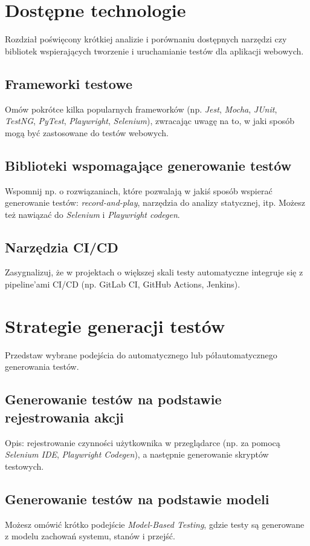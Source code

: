 \documentclass[12pt]{report}
\begin{document}
\chapter{Dostępne technologie}
{Rozdział poświęcony krótkiej analizie i porównaniu dostępnych narzędzi czy bibliotek wspierających tworzenie i uruchamianie testów dla aplikacji webowych.}

\section{Frameworki testowe}
{Omów pokrótce kilka popularnych frameworków (np. \emph{Jest}, \emph{Mocha}, \emph{JUnit}, \emph{TestNG}, \emph{PyTest}, \emph{Playwright}, \emph{Selenium}), zwracając uwagę na to, w jaki sposób mogą być zastosowane do testów webowych.}

\section{Biblioteki wspomagające generowanie testów}
{Wspomnij np. o rozwiązaniach, które pozwalają w jakiś sposób wspierać generowanie testów: \emph{record-and-play}, narzędzia do analizy statycznej, itp. Możesz też nawiązać do \emph{Selenium} i \emph{Playwright codegen}.}

\section{Narzędzia CI/CD}
{Zasygnalizuj, że w projektach o większej skali testy automatyczne integruje się z pipeline’ami CI/CD (np. GitLab CI, GitHub Actions, Jenkins).}

\chapter{Strategie generacji testów}
{Przedstaw wybrane podejścia do automatycznego lub półautomatycznego generowania testów.}

\section{Generowanie testów na podstawie rejestrowania akcji}
{Opis: rejestrowanie czynności użytkownika w przeglądarce (np. za pomocą \emph{Selenium IDE}, \emph{Playwright Codegen}), a następnie generowanie skryptów testowych.}

\section{Generowanie testów na podstawie modeli}
{Możesz omówić krótko podejście \emph{Model-Based Testing}, gdzie testy są generowane z modelu zachowań systemu, stanów i przejść.}
\end{document}
